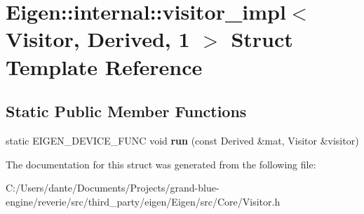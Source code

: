 \hypertarget{struct_eigen_1_1internal_1_1visitor__impl_3_01_visitor_00_01_derived_00_011_01_4}{}\section{Eigen\+::internal\+::visitor\+\_\+impl$<$ Visitor, Derived, 1 $>$ Struct Template Reference}
\label{struct_eigen_1_1internal_1_1visitor__impl_3_01_visitor_00_01_derived_00_011_01_4}
\subsection*{Static Public Member Functions}
\begin{DoxyCompactItemize}
\item 
\mbox{\label{struct_eigen_1_1internal_1_1visitor__impl_3_01_visitor_00_01_derived_00_011_01_4_a86fcc0efcda9aae71c9337f6a8b3d5ae}} 
static E\+I\+G\+E\+N\+\_\+\+D\+E\+V\+I\+C\+E\+\_\+\+F\+U\+NC void {\bfseries run} (const Derived \&mat, Visitor \&visitor)
\end{DoxyCompactItemize}


The documentation for this struct was generated from the following file\+:\begin{DoxyCompactItemize}
\item 
C\+:/\+Users/dante/\+Documents/\+Projects/grand-\/blue-\/engine/reverie/src/third\+\_\+party/eigen/\+Eigen/src/\+Core/Visitor.\+h\end{DoxyCompactItemize}
